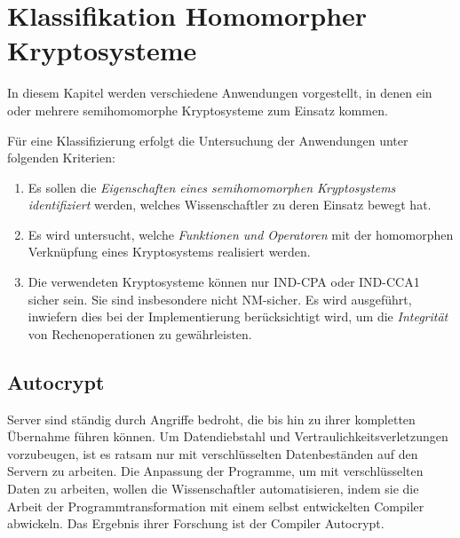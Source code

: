 \chapter[Klassifikation Homomorpher Kryptosysteme]{\texorpdfstring{Klassifikation Homomorpher\\ Kryptosysteme}{Klassifikation Homomorpher Kryptosysteme}}
\label{KHK}

In diesem Kapitel werden verschiedene Anwendungen vorgestellt, in denen ein oder mehrere semihomomorphe Kryptosysteme zum Einsatz kommen. 

Für eine Klassifizierung erfolgt die Untersuchung der Anwendungen unter folgenden Kriterien:
\begin{enumerate}
	\item Es sollen die \textit{Eigenschaften eines semihomomorphen Kryptosystems identifiziert} werden, welches Wissenschaftler zu deren Einsatz bewegt hat.
	\item Es wird untersucht, welche \textit{Funktionen und Operatoren} mit der homomorphen Verknüpfung eines Kryptosystems realisiert werden.
	\item Die verwendeten Kryptosysteme können nur IND-CPA oder IND-CCA1 sicher sein. Sie sind insbesondere nicht NM-sicher. Es wird ausgeführt, inwiefern dies bei der Implementierung berücksichtigt wird, um die \textit{Integrität} von Rechenoperationen zu gewährleisten.
\end{enumerate} 

\section{Autocrypt \cite{tople2013autocrypt}}
\label{autocrypt}
Server sind ständig durch Angriffe bedroht, die bis hin zu ihrer kompletten Übernahme führen können. Um Datendiebstahl und Vertraulichkeitsverletzungen vorzubeugen, ist es ratsam nur mit verschlüsselten Datenbeständen auf den Servern zu arbeiten. Die Anpassung der Programme, um mit verschlüsselten Daten zu arbeiten, wollen die Wissenschaftler automatisieren, indem sie die Arbeit der Programmtransformation mit einem selbst entwickelten Compiler abwickeln. Das Ergebnis ihrer Forschung ist der Compiler Autocrypt.

